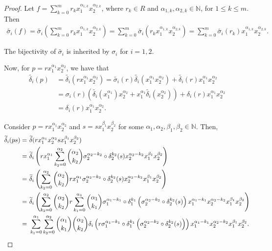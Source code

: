 \documentclass{amsart}
\theoremstyle{definition}
\theoremstyle{remark}
\numberwithin{equation}{section}
\begin{document}
\begin{proof}
Let $f = \displaystyle\sum_{k=0}^m r_kx_1^{\alpha_{1,k}} x_2^{\alpha_{2,k}}$, where $r_k\in R$ and $\alpha_{1,k}, \alpha_{2,k}\in\mathbb{N}$, for $1\leq k \leq m$. Then
\begin{align*}
   \widetilde{\sigma_i}(f) = \widetilde{\sigma_i}\left(\displaystyle\sum_{k=0}^m r_k x_1^{\alpha_{1,k}} x_2^{\alpha_{2,k}}\right) = \displaystyle\sum_{k=0}^m \widetilde{\sigma_i}\left(r_k x_1^{\alpha_{1,k}} x_2^{\alpha_{2,k}}\right) = \displaystyle\sum_{k=0}^m \widetilde{\sigma_i}\left(r_k\right) x_1^{\alpha_{1,k}} x_2^{\alpha_{2,k}}.
\end{align*}

The bijectivity of $\widetilde{\sigma_i}$ is inherited by $\sigma_i$ for $i=1, 2$.

Now, for $p=rx_1^{\alpha_{1}}x_2^{\alpha_{2}}$, we have that
\begin{align*}
     \widetilde{\delta_i}(p)&\ =\widetilde{\delta_i}(rx_1^{\alpha_{1}}x_2^{\alpha_{2}})=\widetilde{\sigma_i}(r)\widetilde{\delta_i}(x_1^{\alpha_{1}}x_2^{\alpha_{2}})+\widetilde{\delta_i}(r)x_1^{\alpha_{1}}x_2^{\alpha_{2}} \\
     &\ = \sigma_i(r)\left(\widetilde{\delta_i}(x_1^{\alpha_{1}})x_2^{\alpha_{2}}+ x_1^{\alpha_{1}}\widetilde{\delta_i}(x_2^{\alpha_{2}})\right)+\delta_i(r)x_1^{\alpha_{1}}x_2^{\alpha_{2}} \\
     &\ = \delta_i(r)x_1^{\alpha_{1}}x_2^{\alpha_{2}}.
\end{align*}

Consider $p=rx_1^{\alpha_{1}}x_2^{\alpha_{2}}$ and $s=sx_1^{\beta_{1}}x_2^{\beta_{2}}$ for some $\alpha_{1},\alpha_{2}, \beta_{1}, \beta_{2} \in \mathbb{N}$. Then,
{\footnotesize{
    \begin{align}
    \widetilde{\delta}_i(ps)= &\ \widetilde{\delta}(rx_1^{\alpha_{1}}x_2^{\alpha_{2}}sx_1^{\beta_{1}}x_2^{\beta_{2}}) \notag \\
    = &\ \widetilde{\delta}_i\left(rx_1^{\alpha_{1}}\sum_{k_2=0}^{\alpha_{2}}\binom{\alpha_{2}}{k_2}\sigma_2^{\alpha_{2}-k_2}\circ\delta_2^{k_2}(s)x_2^{\alpha_{2}-k_2}x_1^{\beta_{1}}x_2^{\beta_{2}}\right) \notag \\
     = &\ \widetilde{\delta}_i\left(\sum_{k_2=0}^{\alpha_{2}}\binom{\alpha_{2}}{k_2}rx_1^{\alpha_{1}}\sigma_2^{\alpha_{2}-k_2}\circ\delta_2^{k_2}(s)x_2^{\alpha_{2}-k_2}x_1^{\beta_{1}}x_2^{\beta_{2}} \right) \notag \\
     = &\ \widetilde{\delta}_i\left(\sum_{k_2=0}^{\alpha_{2}}\binom{\alpha_{2}}{k_2}r\sum_{k_1=0}^{\alpha_{1}}\binom{\alpha_{1}}{k_1}\sigma_1^{\alpha_{1}-k_1}\circ\delta_1^{k_1}\left(\sigma_2^{\alpha_{2}-k_2}\circ\delta_2^{k_2}(s)\right)x_1^{\alpha_{1}-k_1}x_2^{\alpha_{2}-k_2}x_1^{\beta_{1}}x_2^{\beta_{2}} \right) \notag \\
     = &\ \sum_{k_1=0}^{\alpha_{1}}\sum_{k_2=0}^{\alpha_{2}}\dbinom{\alpha_{1}}{k_1}\dbinom{\alpha_{2}}{k_2}\delta_i\left(r\sigma_1^{\alpha_{1}-k_1}\circ\delta_1^{k_1}\left(\sigma_2^{\alpha_{2}-k_2}\circ\delta_2^{k_2}(s)\right)\right)x_1^{\alpha_{1}-k_1}x_2^{\alpha_{2}-k_2}x_1^{\beta_{1}}x_2^{\beta_{2}} \label{reldelta12}.
    \end{align}
}}


\end{proof}
\end{document}
